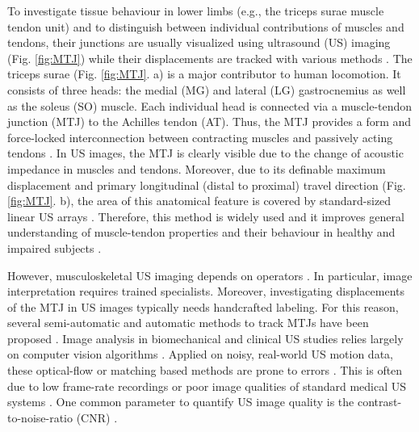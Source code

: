 \documentclass[journal,twoside,web]{ieeecolor}
\begin{document}
To investigate tissue behaviour in lower limbs (e.g., the triceps surae muscle tendon unit) and to distinguish between individual contributions of muscles and tendons, their junctions are usually visualized using ultrasound (US) imaging (Fig. \ref{fig:MTJ}) while their displacements are tracked with various methods \cite{j:Lee2008, j:Zhou2018, j:Cenni2019, c:LeitnerJarolim2020, j:Krupenevich2021}. The triceps surae (Fig. \ref{fig:MTJ}. a) is a major contributor to human locomotion. It consists of three heads: the medial (MG) and lateral (LG) gastrocnemius as well as the soleus (SO) muscle. Each individual head is connected via a muscle-tendon junction (MTJ) to the Achilles tendon (AT). Thus, the MTJ provides a form and force-locked interconnection between contracting muscles and passively acting tendons \cite{j:Charvet2012}. In US images, the MTJ is clearly visible due to the change of acoustic impedance in muscles and tendons. Moreover, due to its definable maximum displacement and primary longitudinal (distal to proximal) travel direction (Fig. \ref{fig:MTJ}. b), the area of this anatomical feature is covered by standard-sized linear US arrays \cite{j:Leitner2019}. Therefore, this method is widely used and it improves general understanding of muscle-tendon properties and their behaviour in healthy \cite{j:Werkhausen2018} and impaired subjects \cite{j:Barber2017, j:Cenni2019}.

However, musculoskeletal US imaging depends on operators \cite{j:Ohrndorf2010}. In particular, image interpretation requires trained specialists. Moreover, investigating displacements of the MTJ in US images typically needs handcrafted labeling. For this reason, several semi-automatic and automatic methods to track MTJs have been proposed \cite{j:Lee2008,j:Zhou2018,j:Cenni2019,j:Kharazi2020}. Image analysis in biomechanical and clinical US studies relies largely on computer vision algorithms \cite{j:Hooren2020}. Applied on noisy, real-world US motion data, these optical-flow or matching based methods are prone to errors \cite{proc:Sukhwan2001}. This is often due to low frame-rate recordings or poor image qualities of standard medical US systems \cite{j:Leitner2019}. One common parameter to quantify US image quality is the contrast-to-noise-ratio (CNR) \cite{j:Ng2011}.
\end{document}
